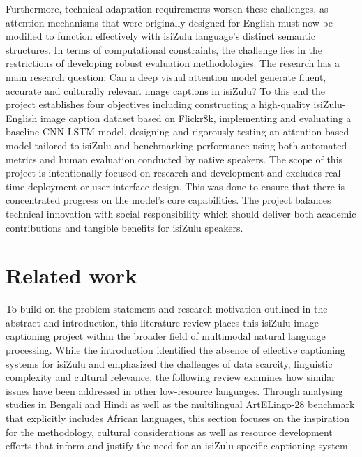 \documentclass{article}
\begin{document}
Furthermore, technical adaptation requirements worsen these challenges, as attention mechanisms that were originally designed for English must now be modified to function effectively with isiZulu language’s distinct semantic structures. In terms of computational constraints, the challenge lies in the restrictions of developing robust evaluation methodologies. The research has a main research question: Can a deep visual attention model generate fluent, accurate and culturally relevant image captions in isiZulu? To this end the project establishes four objectives including constructing a high-quality isiZulu-English image caption dataset based on Flickr8k, implementing and evaluating a baseline CNN-LSTM model, designing and rigorously testing an attention-based model tailored to isiZulu and benchmarking performance using both automated metrics and human evaluation conducted by native speakers.
The scope of this project is intentionally focused on research and development and excludes real-time deployment or user interface design. This was done to ensure that there is concentrated progress on the model’s core capabilities. The project balances technical innovation with social responsibility which should deliver both academic contributions and tangible benefits for isiZulu speakers.


\section{Related work}
To build on the problem statement and research motivation outlined in the abstract and introduction, this literature review places this isiZulu image captioning project within the broader field of multimodal natural language processing. While the introduction identified the absence of effective captioning systems for isiZulu and emphasized the challenges of data scarcity, linguistic complexity and cultural relevance, the following review examines how similar issues have been addressed in other low-resource languages. Through analysing studies in Bengali and Hindi as well as the multilingual ArtELingo-28 benchmark that explicitly includes African languages, this section focuses on the inspiration for the methodology, cultural considerations as well as resource development efforts that inform and justify the need for an isiZulu-specific captioning system.
\end{document}
